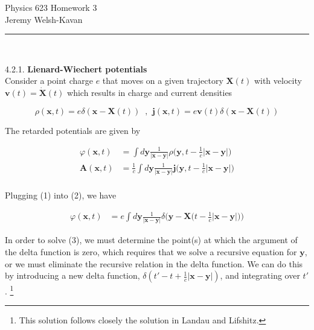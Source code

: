 \documentclass{article}
\begin{document}
{\Large Physics 623 Homework 3}\\
{Jeremy Welsh-Kavan}\\

\vspace{0.2 cm}
\begin{center}
\noindent\rule{15cm}{0.4pt} \\
\end{center}

4.2.1. {\bf Lienard-Wiechert potentials}
\hfill\\

Consider a point charge $e$ that moves on a given trajectory $\bm{X}(t)$ with velocity $\bm{v}(t) = \dot{\bm{X} }(t)$ which results in charge and current densities

\begin{equation}
\rho(\bm{x},t) = e\delta(\bm{x} - \bm{X}(t))  \;\; \text{,} \;\; \bm{j}(\bm{x},t)  = e\bm{v}(t) \delta( \bm{x} - \bm{X}(t)) 
\end{equation}

The retarded potentials are given by

\begin{equation}
\begin{split}
\varphi( \bm{x}, t) & = \int d\bm{y} \frac{1}{|\bm{x} - \bm{y}|} \rho\Big( \bm{y}, t - \frac{1}{c} |\bm{x} - \bm{y} | \Big) \\
\bm{A}(\bm{x},t) & = \frac{1}{c} \int d\bm{y} \frac{1}{|\bm{x} - \bm{y}|} \bm{j} \Big( \bm{y}, t - \frac{1}{c}| \bm{x} - \bm{y} |  \Big)\\
\end{split}
\end{equation}

Plugging (1) into (2), we have

\begin{equation}
\begin{split}
\varphi( \bm{x}, t) & = e\int d\bm{y} \frac{1}{|\bm{x} - \bm{y}|} \delta\Big(\bm{y} - \bm{X}\Big(  t - \frac{1}{c}| \bm{x} - \bm{y} |    \Big)\Big) 
\end{split}
\end{equation}

In order to solve (3), we must determine the point(s) at which the argument of the delta function is zero, which requires that we solve a recursive equation for $\bm{y}$, or we must eliminate the recursive relation in the delta function. We can do this by introducing a new delta function, $\delta( t'  - t +  \frac{1}{c}| \bm{x} - \bm{y} | )$, and integrating over $t'$. \footnote{ This solution follows closely the solution in Landau and Lifshitz. }
\end{document}
